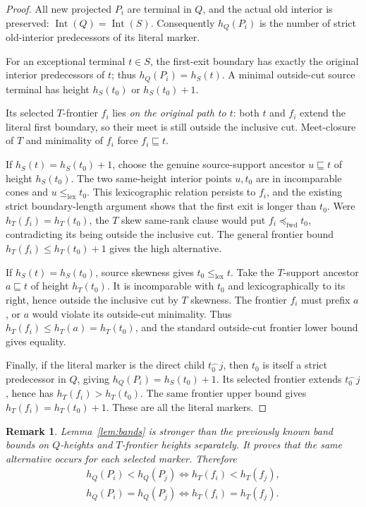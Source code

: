 \documentclass[11pt]{article}
\newtheorem{remark}[theorem]{Remark}
\newcommand{\Int}{\operatorname{Int}}
\newcommand{\htS}{h_S}
\newcommand{\htT}{h_T}
\newcommand{\htQ}{h_Q}
\newcommand{\pre}{\sqsubseteq}
\newcommand{\lex}{\le_{\mathrm{lex}}}
\newcommand{\fwd}{\preccurlyeq_{\mathrm{fwd}}}
\begin{document}
\begin{proof}
All new projected \(P_i\) are terminal in \(Q\),
and the actual old interior is preserved:
\(\Int(Q)=\Int(S)\). Consequently \(\htQ(P_i)\)
is the number of strict old-interior predecessors of
its literal marker.

For an exceptional terminal \(t\in S\), the first-exit
boundary has exactly the original interior predecessors
of \(t\); thus \(\htQ(P_i)=\htS(t)\).
A minimal outside-cut source terminal has height
\(\htS(t_0)\) or \(\htS(t_0)+1\).

Its selected \(T\)-frontier \(f_i\) lies
\emph{on the original path to \(t\)}:
both \(t\) and \(f_i\) extend the literal first boundary,
so their meet is still outside the inclusive cut.
Meet-closure of \(T\) and minimality of \(f_i\)
force \(f_i\pre t\).

If \(\htS(t)=\htS(t_0)+1\), choose the genuine
source-support ancestor \(u\pre t\) of height
\(\htS(t_0)\). The two same-height interior points
\(u,t_0\) are in incomparable cones and
\(u\lex t_0\). This lexicographic relation persists
to \(f_i\), and the existing strict boundary-length
argument shows that the first exit is longer than \(t_0\).
Were \(\htT(f_i)=\htT(t_0)\), the \(T\) skew
same-rank clause would put \(f_i\fwd t_0\),
contradicting its being outside the inclusive cut.
The general frontier bound
\(\htT(f_i)\le\htT(t_0)+1\) gives the high alternative.

If \(\htS(t)=\htS(t_0)\), source skewness gives
\(t_0\lex t\). Take the \(T\)-support ancestor \(a\pre t\)
of height \(\htT(t_0)\). It is incomparable with \(t_0\)
and lexicographically to its right, hence outside
the inclusive cut by \(T\) skewness. The frontier
\(f_i\) must prefix \(a\), or \(a\) would violate
its outside-cut minimality. Thus
\(\htT(f_i)\le\htT(a)=\htT(t_0)\), and the standard
outside-cut frontier lower bound gives equality.

Finally, if the literal marker is the direct child
\(t_0^\frown j\), then \(t_0\) is itself a strict
predecessor in \(Q\), giving
\(\htQ(P_i)=\htS(t_0)+1\).
Its selected frontier extends \(t_0^\frown j\),
hence has \(\htT(f_i)>\htT(t_0)\).
The same frontier upper bound gives
\(\htT(f_i)=\htT(t_0)+1\).
These are all the literal markers.
\end{proof}

\begin{remark}
Lemma~\ref{lem:bands} is stronger than the previously
known band bounds on \(Q\)-heights and \(T\)-frontier
heights separately. It proves that the \emph{same}
alternative occurs for each selected marker.
Therefore
\[
\begin{gathered}
 \htQ(P_i)<\htQ(P_j)
   \iff \htT(f_i)<\htT(f_j),\\
 \htQ(P_i)=\htQ(P_j)
   \iff \htT(f_i)=\htT(f_j).
\end{gathered}
\]
\end{remark}
\end{document}
